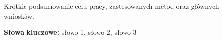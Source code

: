 
Krótkie podsumowanie celu pracy, zastosowanych metod oraz głównych wniosków.

\medskip
\noindent\textbf{Słowa kluczowe:} słowo 1, słowo 2, słowo 3
